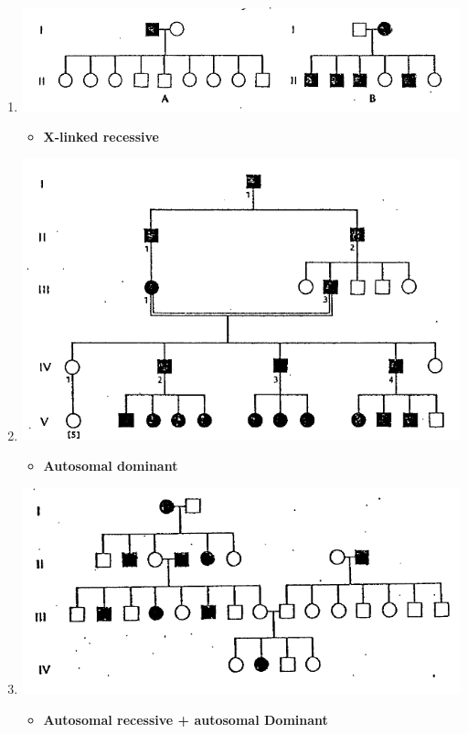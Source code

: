 \documentclass[plain,basic]{inVerba-notes}
\begin{document}
    \begin{enumerate}[label=\textbf{\alph*}.]
        \item \includegraphics[scale=0.4]{images/pedigree-6.png}
            \begin{itemize}
                \item \textbf{X-linked recessive}
            \end{itemize}
        \item \includegraphics[scale=0.4]{images/pedigree-7.png}
            \begin{itemize}
                \item \textbf{Autosomal dominant}
            \end{itemize}
        \item \includegraphics[scale=0.4,angle=-0.5,origin=c]{images/pedigree-8.png}
            \begin{itemize}
                \item \textbf{Autosomal recessive + autosomal Dominant}
            \end{itemize}
    \end{enumerate}
\end{document}
